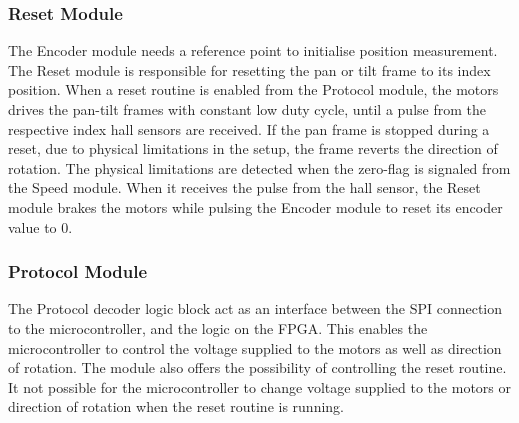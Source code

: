 \documentclass[../../main.tex]{subfiles}
\begin{document}
\subsubsection*{Reset Module}
The Encoder module needs a reference point to initialise position measurement.
The Reset module is responsible for resetting the pan or tilt frame to its index position. When a reset routine is enabled from the Protocol module, the motors drives the pan-tilt frames with constant low duty cycle, until a pulse from the respective index hall sensors are received. If the pan frame is stopped during a reset, due to physical limitations in the setup, the frame reverts the direction of rotation. The physical limitations are detected when the zero-flag is signaled from the Speed module. When it receives the pulse from the hall sensor, the Reset module brakes the motors while pulsing the Encoder module to reset its encoder value to 0. 





\subsubsection*{Protocol Module}
The Protocol decoder logic block act as an interface between the SPI connection to the microcontroller, and the logic on the FPGA. This enables the microcontroller to control the voltage supplied to the motors as well as direction of rotation. The module also offers the possibility of controlling the reset routine. It not possible for the microcontroller to change voltage supplied to the motors or direction of rotation when the reset routine is running.  

\end{document}
